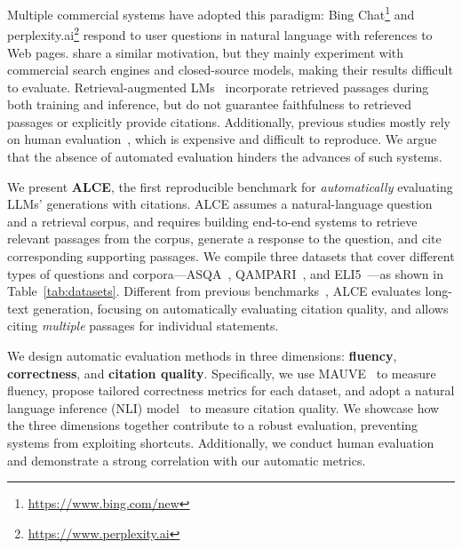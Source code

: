 \documentclass[11pt]{article}
\newcommand\tf[1]{\textbf{#1}}
\newcommand{\citeeval}{ALCE}
\begin{document}
Multiple commercial systems have adopted this paradigm: %
Bing Chat\footnote{\url{https://www.bing.com/new}} and perplexity.ai\footnote{\url{https://www.perplexity.ai}}
respond to user questions in natural language with references to Web pages.
\citet{nakano2021webgpt,menick2022teaching} share a similar motivation, but they mainly experiment with commercial search engines and closed-source models, making their results difficult to evaluate.
Retrieval-augmented LMs~\citep{borgeaud2022retro,izacard2022atlas}
incorporate retrieved passages during both training and inference,
but do not guarantee faithfulness to retrieved passages or explicitly provide citations.
Additionally,
previous studies mostly rely on human evaluation~\cite{nakano2021webgpt,menick2022teaching,liu2023evaluating}, which is expensive and difficult to reproduce.
We argue that the absence of automated evaluation
hinders the advances of such systems.

We present \tf{\citeeval{}}, the first {reproducible} benchmark for \textit{automatically} evaluating LLMs'  generations with citations.
\citeeval{} assumes a natural-language question and a retrieval corpus, and requires building end-to-end systems to retrieve relevant passages from the corpus, generate a response to the question, and cite corresponding supporting passages.
We compile three datasets that cover different types of questions and corpora---ASQA~\cite{stelmakh2022asqa}, QAMPARI~\cite{rubin2022qampari}, and ELI5~\cite{fan-etal-2019-eli5}---as shown in Table~\ref{tab:datasets}.
Different from previous benchmarks~\citep{lee-etal-2019-latent,bohnet2022attributed},
\citeeval{} evaluates long-text generation, 
focusing on automatically evaluating citation quality,
and allows citing \textit{multiple} passages for individual statements.

We design automatic evaluation methods in three dimensions:
\tf{fluency}, \tf{correctness}, and \tf{citation quality}.
Specifically,
we use MAUVE~\citep{pillutla2021mauve} to measure fluency, 
propose tailored correctness metrics for each dataset, %
and
adopt a natural language inference (NLI) model~\citep{honovich-etal-2022-true-evaluating} to measure citation quality.
We showcase how the three dimensions together contribute to a robust evaluation, 
preventing systems from exploiting shortcuts. %
Additionally, we conduct human evaluation and demonstrate a strong correlation with our automatic metrics.
\end{document}
